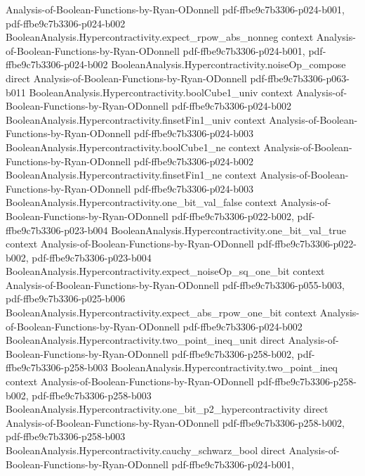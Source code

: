 \begin{theorem}
  {Analysis-of-Boolean-Functions-by-Ryan-ODonnell}
  {pdf-ffbe9c7b3306-p024-b001,
    pdf-ffbe9c7b3306-p024-b002}
\proofstep
  {BooleanAnalysis.Hypercontractivity.expect_rpow_abs_nonneg}
  {context}
  {Analysis-of-Boolean-Functions-by-Ryan-ODonnell}
  {pdf-ffbe9c7b3306-p024-b001,
    pdf-ffbe9c7b3306-p024-b002}
\proofstep
  {BooleanAnalysis.Hypercontractivity.noiseOp_compose}
  {direct}
  {Analysis-of-Boolean-Functions-by-Ryan-ODonnell}
  {pdf-ffbe9c7b3306-p063-b011}
\proofstep
  {BooleanAnalysis.Hypercontractivity.boolCube1_univ}
  {context}
  {Analysis-of-Boolean-Functions-by-Ryan-ODonnell}
  {pdf-ffbe9c7b3306-p024-b002}
\proofstep
  {BooleanAnalysis.Hypercontractivity.finsetFin1_univ}
  {context}
  {Analysis-of-Boolean-Functions-by-Ryan-ODonnell}
  {pdf-ffbe9c7b3306-p024-b003}
\proofstep
  {BooleanAnalysis.Hypercontractivity.boolCube1_ne}
  {context}
  {Analysis-of-Boolean-Functions-by-Ryan-ODonnell}
  {pdf-ffbe9c7b3306-p024-b002}
\proofstep
  {BooleanAnalysis.Hypercontractivity.finsetFin1_ne}
  {context}
  {Analysis-of-Boolean-Functions-by-Ryan-ODonnell}
  {pdf-ffbe9c7b3306-p024-b003}
\proofstep
  {BooleanAnalysis.Hypercontractivity.one_bit_val_false}
  {context}
  {Analysis-of-Boolean-Functions-by-Ryan-ODonnell}
  {pdf-ffbe9c7b3306-p022-b002,
    pdf-ffbe9c7b3306-p023-b004}
\proofstep
  {BooleanAnalysis.Hypercontractivity.one_bit_val_true}
  {context}
  {Analysis-of-Boolean-Functions-by-Ryan-ODonnell}
  {pdf-ffbe9c7b3306-p022-b002,
    pdf-ffbe9c7b3306-p023-b004}
\proofstep
  {BooleanAnalysis.Hypercontractivity.expect_noiseOp_sq_one_bit}
  {context}
  {Analysis-of-Boolean-Functions-by-Ryan-ODonnell}
  {pdf-ffbe9c7b3306-p055-b003,
    pdf-ffbe9c7b3306-p025-b006}
\proofstep
  {BooleanAnalysis.Hypercontractivity.expect_abs_rpow_one_bit}
  {context}
  {Analysis-of-Boolean-Functions-by-Ryan-ODonnell}
  {pdf-ffbe9c7b3306-p024-b002}
\proofstep
  {BooleanAnalysis.Hypercontractivity.two_point_ineq_unit}
  {direct}
  {Analysis-of-Boolean-Functions-by-Ryan-ODonnell}
  {pdf-ffbe9c7b3306-p258-b002,
    pdf-ffbe9c7b3306-p258-b003}
\proofstep
  {BooleanAnalysis.Hypercontractivity.two_point_ineq}
  {context}
  {Analysis-of-Boolean-Functions-by-Ryan-ODonnell}
  {pdf-ffbe9c7b3306-p258-b002,
    pdf-ffbe9c7b3306-p258-b003}
\proofstep
  {BooleanAnalysis.Hypercontractivity.one_bit_p2_hypercontractivity}
  {direct}
  {Analysis-of-Boolean-Functions-by-Ryan-ODonnell}
  {pdf-ffbe9c7b3306-p258-b002,
    pdf-ffbe9c7b3306-p258-b003}
\proofstep
  {BooleanAnalysis.Hypercontractivity.cauchy_schwarz_bool}
  {direct}
  {Analysis-of-Boolean-Functions-by-Ryan-ODonnell}
  {pdf-ffbe9c7b3306-p024-b001,
}
\end{theorem}
